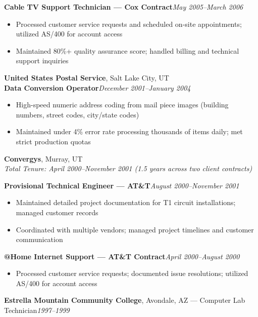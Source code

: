 \documentclass[9pt,letterpaper]{extarticle}
\begin{document}
\textbf{Cable TV Support Technician --- Cox Contract}\hfill\textit{May 2005--March 2006}
\begin{itemize}
  \item Processed customer service requests and scheduled on-site appointments; utilized AS/400 for account access
  \item Maintained 80\%+ quality assurance score; handled billing and technical support inquiries
\end{itemize}

\vspace{5pt}
\noindent\textbf{United States Postal Service}, Salt Lake City, UT\\
\textbf{Data Conversion Operator}\hfill\textit{December 2001--January 2004}
\begin{itemize}
  \item High-speed numeric address coding from mail piece images (building numbers, street codes, city/state codes)
  \item Maintained under 4\% error rate processing thousands of items daily; met strict production quotas
\end{itemize}

\vspace{5pt}
\noindent\textbf{Convergys}, Murray, UT\\
\textit{Total Tenure: April 2000--November 2001 (1.5 years across two client contracts)}

\smallskip
{}
\textbf{Provisional Technical Engineer --- AT\&T}\hfill\textit{August 2000--November 2001}
\begin{itemize}
  \item Maintained detailed project documentation for T1 circuit installations; managed customer records
  \item Coordinated with multiple vendors; managed project timelines and customer communication
\end{itemize}

\textbf{@Home Internet Support --- AT\&T Contract}\hfill\textit{April 2000--August 2000}
\begin{itemize}
  \item Processed customer service requests; documented issue resolutions; utilized AS/400 for account access
\end{itemize}

\vspace{3pt}
\noindent\textbf{Estrella Mountain Community College}, Avondale, AZ --- Computer Lab Technician\hfill\textit{1997--1999}
\end{document}
